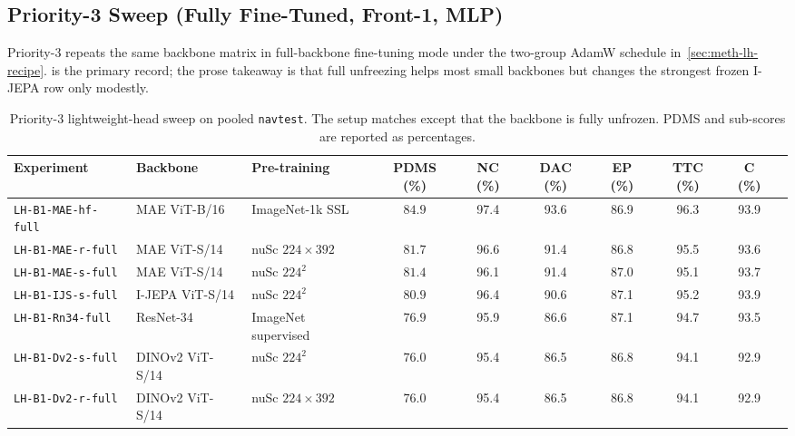\subsection{Priority-3 Sweep (Fully Fine-Tuned, Front-1, MLP)}
\label{sec:exp-phase0-p3}

Priority-3 repeats the same backbone matrix in full-backbone fine-tuning mode under the two-group AdamW schedule in~\ref{sec:meth-lh-recipe}.  is the primary record; the prose takeaway is that full unfreezing helps most small backbones but changes the strongest frozen I-JEPA row only modestly.

\begin{table}[ht]
\centering
\caption[Priority-3 lightweight-head sweep (fully fine-tuned backbone).]{Priority-3 lightweight-head sweep on pooled \texttt{navtest}. The setup matches  except that the backbone is fully unfrozen. PDMS and sub-scores are reported as percentages.}
\label{tab:exp-phase0-p3}
\footnotesize
\renewcommand{\arraystretch}{1.15}
\setlength{\tabcolsep}{4pt}
\begin{adjustbox}{max width=\textwidth}
\begin{tabular}{@{}>{\raggedright\arraybackslash}p{3.2cm} >{\raggedright\arraybackslash}p{2.4cm} >{\raggedright\arraybackslash}p{2.6cm} ccccccc@{}}
\toprule
\textbf{Experiment} & \textbf{Backbone} & \textbf{Pre-training} & \textbf{PDMS (\%)} & \textbf{NC (\%)} & \textbf{DAC (\%)} & \textbf{EP (\%)} & \textbf{TTC (\%)} & \textbf{C (\%)} \\
\midrule
\texttt{LH-B1-MAE-hf-full} & MAE ViT-B/16    & ImageNet-1k SSL       & $\mathbf{84.9}$ & 97.4 & 93.6 & 86.9 & 96.3 & 93.9 \\
\texttt{LH-B1-MAE-r-full}  & MAE ViT-S/14    & nuSc $224{\times}392$ & $81.7$ & 96.6 & 91.4 & 86.8 & 95.5 & 93.6 \\
\texttt{LH-B1-MAE-s-full}  & MAE ViT-S/14    & nuSc $224^2$          & $81.4$ & 96.1 & 91.4 & 87.0 & 95.1 & 93.7 \\
\texttt{LH-B1-IJS-s-full}  & I-JEPA ViT-S/14 & nuSc $224^2$          & $80.9$ & 96.4 & 90.6 & 87.1 & 95.2 & 93.9 \\
\rowcolor{gray!15}
\texttt{LH-B1-Rn34-full}   & ResNet-34       & ImageNet supervised   & $76.9$ & 95.9 & 86.6 & 87.1 & 94.7 & 93.5 \\
\texttt{LH-B1-Dv2-s-full}  & DINOv2 ViT-S/14 & nuSc $224^2$          & $76.0$ & 95.4 & 86.5 & 86.8 & 94.1 & 92.9 \\
\texttt{LH-B1-Dv2-r-full}  & DINOv2 ViT-S/14 & nuSc $224{\times}392$ & $76.0$ & 95.4 & 86.5 & 86.8 & 94.1 & 92.9 \\

\end{tabular}
\end{adjustbox}
\end{table}
